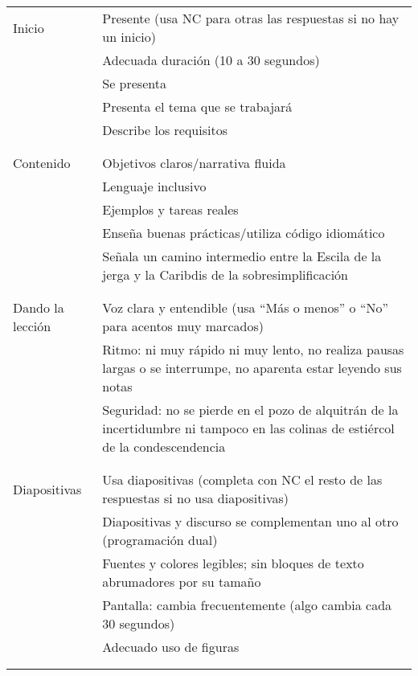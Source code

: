 \noindent
\begin{longtable}{p{}p{}}

  Inicio
  & Presente (usa NC para otras las respuestas si no hay un inicio) \\
  & Adecuada duración (10 a 30 segundos) \\
  & Se presenta \\
  & Presenta el tema que se trabajará \\
  & Describe los requisitos \\
  \\ [-1.5ex] \hline \\ [-1.5ex]

  Contenido
  & Objetivos claros/narrativa fluida \\
  & Lenguaje inclusivo \\
  & Ejemplos y tareas reales \\
  & Enseña buenas prácticas/utiliza código idiomático\\
  & Señala un camino intermedio entre la Escila de la jerga y la Caribdis de la sobresimplificación \\
  \\ [-1.5ex] \hline \\ [-1.5ex]

  Dando la lección
  & Voz clara y entendible (usa ``Más o menos'' o ``No'' para acentos muy marcados) \\
  & Ritmo: ni muy rápido ni muy lento, no realiza pausas largas o se interrumpe, no aparenta estar leyendo sus notas \\
  & Seguridad: no se pierde en el pozo de alquitrán de la incertidumbre ni tampoco en las colinas de estiércol de la condescendencia \\
  \\ [-1.5ex] \hline \\ [-1.5ex]

  Diapositivas
  & Usa diapositivas (completa con NC el resto de las respuestas si no usa diapositivas) \\
  & Diapositivas y discurso se complementan uno al otro (programación dual) \\
  & Fuentes y colores legibles; sin bloques de texto abrumadores por su tamaño\\
  & Pantalla: cambia frecuentemente (algo cambia cada 30 segundos) \\
  & Adecuado uso de figuras \\
  \\ [-1.5ex] \hline \\ [-1.5ex]


\end{longtable}
